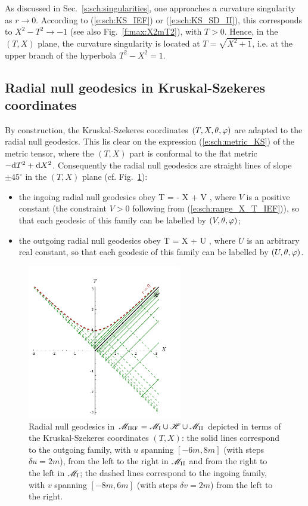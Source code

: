 As discussed in Sec.~\ref{s:sch:singularities}, one approaches a
curvature singularity as $r\rightarrow 0$. According to (\ref{e:sch:KS_IEF})
or (\ref{e:sch:KS_SD_II}),
this corresponds to $X^2-T^2 \rightarrow -1$ (see also Fig.~\ref{f:max:X2mT2}), with
$T > 0$. Hence, in the $(T,X)$ plane, the curvature singularity is located
at $T = \sqrt{X^2 + 1}$, i.e. at the upper branch of the hyperbola
$T^2 - X^2 = 1$.

\subsection{Radial null geodesics in Kruskal-Szekeres coordinates}
\label{s:sch:rad_null_geod_KS}

By construction, the Kruskal-Szekeres coordinates $(T,X,\theta,\varphi)$ are
adapted to the radial null geodesics. This lis clear on the expression
(\ref{e:sch:metric_KS}) of the metric tensor, where the $(T,X)$ part is
conformal to the flat metric $- \mathrm{d} T^2 + \mathrm{d} X^2$. Consequently the radial
null geodesics are straight lines of slope $\pm 45^\circ$ in the $(T,X)$ plane
(cf. Fig.~\ref{f:sch:rad_null_geod_KS}):
\begin{itemize}
\item the ingoing radial null geodesics obey
\be \label{e:sch:ingoing_null_geod_KS}
    T = - X + V ,
\ee
where $V$ is a positive constant (the constraint $V>0$ following from (\ref{e:sch:range_X_T_IEF})), so that each geodesic of this family can be labelled
by $(V,\theta,\varphi)$;
\item the outgoing radial null geodesics obey
\be \label{e:sch:outgoing_null_geod_KS}
    T = X + U ,
\ee
where $U$ is an arbitrary real constant, so that each geodesic of this family can be labelled
by $(U,\theta,\varphi)$.
\end{itemize}
\begin{figure}
\centerline{\includegraphics[width=0.6\textwidth]{sch_rad_null_geod_KS.pdf}}
\caption[]{\label{f:sch:rad_null_geod_KS} \footnotesize
Radial null geodesics in $\mathscr{M}_{\rm IEF} = \mathscr{M}_{\rm I}\cup\mathscr{H}\cup\mathscr{M}_{\rm II}$
depicted in terms of the Kruskal-Szekeres coordinates $(T,X)$: the solid
lines correspond to the outgoing family, with $u$ spanning $[-6m, 8m]$
(with steps $\delta u = 2m$), from the left to the right in $\mathscr{M}_{\rm II}$
and from the right to the left in $\mathscr{M}_{\rm I}$; the dashed lines
correspond to the ingoing family, with $v$ spanning $[-8m, 6m]$ (with steps $\delta v = 2m$)
from the left to the right.}
\end{figure}
